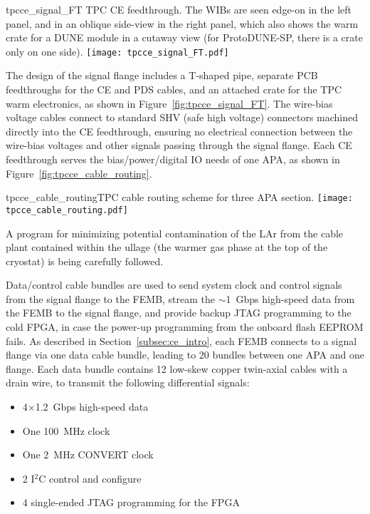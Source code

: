 \begin{cdrfigure}{tpcce_signal_FT}{
TPC CE feedthrough. The WIBs are seen edge-on in the left panel,
and in an oblique side-view in the right panel, which also shows the warm crate for a DUNE module in a cutaway view (for 
ProtoDUNE-SP, there is a crate only on one side).}
\texttt{[image: tpcce\_signal\_FT.pdf]}
\end{cdrfigure}

The design of the signal flange includes a T-shaped pipe, separate PCB feedthroughs for the CE and PDS cables, and
an attached crate for the TPC warm electronics, as shown in Figure~\ref{fig:tpcce_signal_FT}.
The wire-bias voltage cables connect to standard SHV (safe high voltage) connectors machined directly into the CE feedthrough,
ensuring no electrical connection between the wire-bias voltages and other signals passing through the signal flange.
Each CE feedthrough serves the bias/power/digital IO needs of one APA, as shown 
in Figure~\ref{fig:tpcce_cable_routing}.  

\begin{cdrfigure}{tpcce_cable_routing}{TPC cable routing scheme for three APA section.}
\texttt{[image: tpcce\_cable\_routing.pdf]}
\end{cdrfigure}

A program for minimizing potential contamination of the LAr from the cable plant contained within the ullage
(the warmer gas phase at the top of the cryostat) 
is being carefully followed.


Data/control cable bundles are used to send system clock and control signals from the 
signal flange to the FEMB, stream the $\sim$1~Gbps high-speed data from the FEMB to the signal flange, and 
provide backup JTAG programming to the cold FPGA, in case the power-up programming from the onboard 
flash EEPROM fails. As described in Section~\ref{subsec:ce_intro}, each FEMB 
connects to a signal flange via one data cable bundle, leading to 20 bundles between one APA and one flange.
Each data bundle contains 12 low-skew copper twin-axial cables with a drain wire, 
to transmit the following differential signals:

\begin{itemize}
    \item 4$\times$1.2~Gbps high-speed data
    \item One 100~MHz clock
    \item One 2~MHz CONVERT clock
    \item 2 I$^2$C control and configure
    \item 4 single-ended JTAG programming for the FPGA
\end{itemize}

